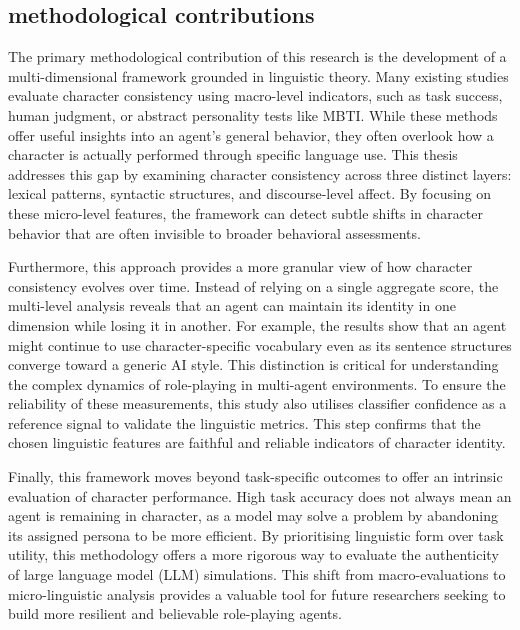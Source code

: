 \documentclass{article}
\begin{document}
\subsection{methodological contributions}

The primary methodological contribution of this research is the development of a multi-dimensional framework grounded in linguistic theory. Many existing studies evaluate character consistency using macro-level indicators, such as task success, human judgment, or abstract personality tests like MBTI. While these methods offer useful insights into an agent's general behavior, they often overlook how a character is actually performed through specific language use. This thesis addresses this gap by examining character consistency across three distinct layers: lexical patterns, syntactic structures, and discourse-level affect. By focusing on these micro-level features, the framework can detect subtle shifts in character behavior that are often invisible to broader behavioral assessments. 

Furthermore, this approach provides a more granular view of how character consistency evolves over time. Instead of relying on a single aggregate score, the multi-level analysis reveals that an agent can maintain its identity in one dimension while losing it in another. For example, the results show that an agent might continue to use character-specific vocabulary even as its sentence structures converge toward a generic AI style. This distinction is critical for understanding the complex dynamics of role-playing in multi-agent environments. To ensure the reliability of these measurements, this study also utilises classifier confidence as a reference signal to validate the linguistic metrics. This step confirms that the chosen linguistic features are faithful and reliable indicators of character identity.

Finally, this framework moves beyond task-specific outcomes to offer an intrinsic evaluation of character performance. High task accuracy does not always mean an agent is remaining in character, as a model may solve a problem by abandoning its assigned persona to be more efficient. By prioritising linguistic form over task utility, this methodology offers a more rigorous way to evaluate the authenticity of large language model (LLM) simulations. This shift from macro-evaluations to micro-linguistic analysis provides a valuable tool for future researchers seeking to build more resilient and believable role-playing agents.
\end{document}
